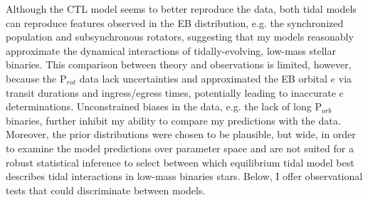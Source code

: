 Although the CTL model seems to better reproduce the \citet{Lurie2017} data, both tidal models can reproduce features observed in the \kepler EB distribution, e.g. the synchronized population and subsynchronous rotators, suggesting that my models reasonably approximate the dynamical interactions of tidally-evolving, low-mass stellar binaries. This comparison between theory and observations is limited, however, because the \citet{Lurie2017} P$_{rot}$ data lack uncertainties and \citet{Lurie2017} approximated the EB orbital $e$ via transit durations and ingress/egress times, potentially leading to inaccurate $e$ determinations. Unconstrained biases in the data, e.g. the lack of long P$_{orb}$ binaries, further inhibit my ability to compare my predictions with the data. Moreover, the prior distributions were chosen to be plausible, but wide, in order to examine the model predictions over parameter space and are not suited for a robust statistical inference to select between which equilibrium tidal model best describes tidal interactions in low-mass binaries stars. Below, I offer observational tests that could discriminate between models.

